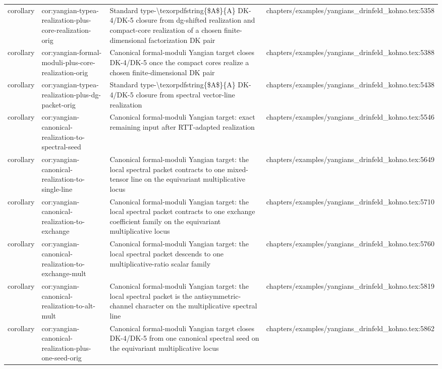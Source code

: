 \documentclass[11pt]{article}
\begin{document}
\begin{longtable}{L{0.10\textwidth}L{0.26\textwidth}L{0.42\textwidth}L{0.22\textwidth}}
corollary & cor:yangian-typea-realization-plus-core-realization-orig & Standard type-\textbackslash{}texorpdfstring\{\$A\$\}\{A\} DK-4/DK-5 closure from dg-shifted realization and compact-core realization of a chosen finite-dimensional factorization DK pair & chapters/examples/yangians\_drinfeld\_kohno.tex:5358\\
corollary & cor:yangian-formal-moduli-plus-core-realization-orig & Canonical formal-moduli Yangian target closes DK-4/DK-5 once the compact cores realize a chosen finite-dimensional DK pair & chapters/examples/yangians\_drinfeld\_kohno.tex:5388\\
corollary & cor:yangian-typea-realization-plus-dg-packet-orig & Standard type-\textbackslash{}texorpdfstring\{\$A\$\}\{A\} DK-4/DK-5 closure from spectral vector-line realization & chapters/examples/yangians\_drinfeld\_kohno.tex:5438\\
corollary & cor:yangian-canonical-realization-to-spectral-seed & Canonical formal-moduli Yangian target: exact remaining input after RTT-adapted realization & chapters/examples/yangians\_drinfeld\_kohno.tex:5546\\
corollary & cor:yangian-canonical-realization-to-single-line & Canonical formal-moduli Yangian target: the local spectral packet contracts to one mixed-tensor line on the equivariant multiplicative locus & chapters/examples/yangians\_drinfeld\_kohno.tex:5649\\
corollary & cor:yangian-canonical-realization-to-exchange & Canonical formal-moduli Yangian target: the local spectral packet contracts to one exchange coefficient family on the equivariant multiplicative locus & chapters/examples/yangians\_drinfeld\_kohno.tex:5710\\
corollary & cor:yangian-canonical-realization-to-exchange-mult & Canonical formal-moduli Yangian target: the local spectral packet descends to one multiplicative-ratio scalar family & chapters/examples/yangians\_drinfeld\_kohno.tex:5760\\
corollary & cor:yangian-canonical-realization-to-alt-mult & Canonical formal-moduli Yangian target: the local spectral packet is the antisymmetric-channel character on the multiplicative spectral line & chapters/examples/yangians\_drinfeld\_kohno.tex:5819\\
corollary & cor:yangian-canonical-realization-plus-one-seed-orig & Canonical formal-moduli Yangian target closes DK-4/DK-5 from one canonical spectral seed on the equivariant multiplicative locus & chapters/examples/yangians\_drinfeld\_kohno.tex:5862\\

\end{longtable}
\end{document}
